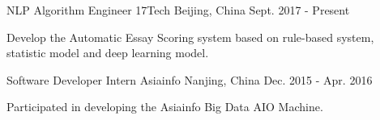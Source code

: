 

\begin{cventries}

  \cventry
    {NLP Algorithm Engineer} %
    {17Tech} %
    {Beijing, China} %
    {Sept. 2017 - Present} %
    {
      \begin{cvitems} %
        \item {Develop the Automatic Essay Scoring system based on rule-based system, statistic model and deep learning model.}
      \end{cvitems}
    }

  \cventry
    {Software Developer Intern} %
    {Asiainfo} %
    {Nanjing, China} %
    {Dec. 2015 - Apr. 2016} %
    {
      \begin{cvitems} %
        \item {Participated in developing the Asiainfo Big Data AIO Machine.}
      \end{cvitems}
    }


\end{cventries}